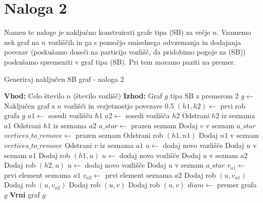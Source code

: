 \documentclass{article}
\begin{document}
\section{Naloga 2}

Namen te naloge je naključno konstruirati grafe tipa (SB) za večje $n$.
Vzamemo nek graf na $n$ vozliščih in ga s pomočjo smiselnega odvzemanja in dodajanja povezav 
(poskušamo doseči na particijo vozlišč, da pridobimo pogoje za (SB)) poskušamo 
spremeniti v graf tipa (SB). Pri tem moramo paziti na premer.


\begin{algorithm}
    \caption{Generiraj naključen SB graf - naloga 2}
    \begin{algorithmic}[1]
    \State \textbf{Vhod:} Celo število $n$ (število vozlišč)
    \State \textbf{Izhod:} Graf $g$ tipa SB z premerom 2
    \State $g \gets$ Naključen graf z $n$ vozlišči in verjetnostjo povezave 0.5
    \State $(h1, h2) \gets$ prvi rob grafa $g$
    \State $a1 \gets$ sosedi vozlišča $h1$
    \State $a2 \gets$ sosedi vozlišča $h2$
    \State Odstrani $h2$ iz seznama $a1$
    \State Odstrani $h1$ iz seznama $a2$
    \State $a\_star \gets$ prazen seznam
            \State Dodaj $v$ v seznam $a\_star$
        \EndIf
    \EndFor
    \State $vertices\_to\_remove \gets$ prazen seznam
                \State Odstrani rob $(h1, n1)$
                \State Dodaj $n1$ v seznam $vertices\_to\_remove$
            \EndIf
        \EndFor
    \EndFor
        \State Odstrani $v$ iz seznama $a1$
    \EndFor
        \State $u \gets$ dodaj novo vozlišče
        \State Dodaj $u$ v seznam $a1$
        \State Dodaj rob $(h1, u)$
    \EndIf
        \State $u \gets$ dodaj novo vozlišče
        \State Dodaj $u$ v seznam $a2$
        \State Dodaj rob $(h2, u)$
    \EndIf
        \State $u \gets$ dodaj novo vozlišče
        \State Dodaj $u$ v seznam $a\_star$
        \State $v_{a1} \gets$ prvi element seznama $a1$
        \State $v_{a2} \gets$ prvi element seznama $a2$
        \State Dodaj rob $(u, v_{a1})$
        \State Dodaj rob $(u, v_{a2})$
    \EndIf
            \State Dodaj rob $(u, v)$
        \EndFor
    \EndFor
            \State Dodaj rob $(u, v)$
        \EndFor
    \EndFor
    \State $diam \gets$ premer grafa $g$
        \State \textbf{Vrni} graf $g$
    \EndIf
    \end{algorithmic}
    \end{algorithm}
    
\end{document}
